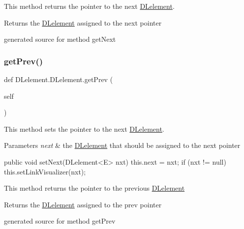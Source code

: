 This method returns the pointer to the next \hyperlink{class_d_lelement_1_1_d_lelement}{D\+Lelement}. 

\begin{DoxyReturn}{Returns}
the \hyperlink{class_d_lelement_1_1_d_lelement}{D\+Lelement} assigned to the next pointer\begin{DoxyVerb}generated source for method getNext \end{DoxyVerb}
 
\end{DoxyReturn}
\hypertarget{class_d_lelement_1_1_d_lelement_a05ecf23273037e12fcaab38013e2760e}{}\label{class_d_lelement_1_1_d_lelement_a05ecf23273037e12fcaab38013e2760e} 
\subsubsection{\texorpdfstring{get\+Prev()}{getPrev()}}
{\footnotesize\ttfamily def D\+Lelement.\+D\+Lelement.\+get\+Prev (\begin{DoxyParamCaption}\item[{}]{self }\end{DoxyParamCaption})}



This method sets the pointer to the next \hyperlink{class_d_lelement_1_1_d_lelement}{D\+Lelement}. 


\begin{DoxyParams}{Parameters}
{\em next} & the \hyperlink{class_d_lelement_1_1_d_lelement}{D\+Lelement} that should be assigned to the next pointer\\
\hline
\end{DoxyParams}
\begin{DoxyVerb}    public void setNext(DLelement<E> nxt) {
        this.next = nxt;
        if (nxt != null)
            this.setLinkVisualizer(nxt);
    }
\end{DoxyVerb}


This method returns the pointer to the previous \hyperlink{class_d_lelement_1_1_d_lelement}{D\+Lelement}

\begin{DoxyReturn}{Returns}
the \hyperlink{class_d_lelement_1_1_d_lelement}{D\+Lelement} assigned to the prev pointer\begin{DoxyVerb}generated source for method getPrev \end{DoxyVerb}
 
\end{DoxyReturn}
\hypertarget{class_d_lelement_1_1_d_lelement_a49e8225b9c3afa5f306480d50b4166f9}{}\label{class_d_lelement_1_1_d_lelement_a49e8225b9c3afa5f306480d50b4166f9} 
